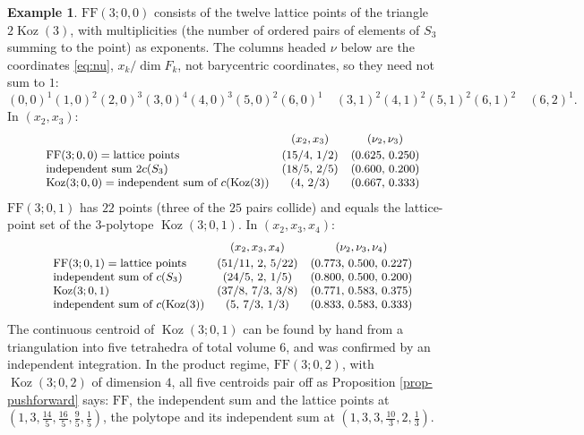 \documentclass[11pt, a4paper, abstract=yes]{scrartcl}
\theoremstyle{definition}
\newtheorem{mexample}[definition]{Example}
\theoremstyle{remark}
\theoremstyle{plain}
\theoremstyle{remark}
\theoremstyle{plain}
\newcommand{\Koz}{\operatorname{Koz}}
\newcommand{\FF}{\mathrm{FF}}
\begin{document}
\begin{mexample}
\(\FF(3;0,0)\) consists of the twelve lattice points of the triangle \(2\Koz(3)\), with multiplicities (the
number of ordered pairs of elements of \(S_3\) summing to the point) as exponents. The columns
headed \(\nu\) below are the coordinates \eqref{eq:nu}, \(x_k/\dim F_k\), not barycentric
coordinates, so they need not sum to \(1\):
\[
  (0,0)^1(1,0)^2(2,0)^3(3,0)^4(4,0)^3(5,0)^2(6,0)^1\quad(3,1)^2(4,1)^2(5,1)^2(6,1)^2\quad(6,2)^1 .
\]
In
\((x_2,x_3)\):
\[\small
\begin{array}{lcc}
 & (x_2,x_3) & (\nu_2,\nu_3)\\[2pt]
\FF(3;0,0)=\text{lattice points} & (15/4,\,1/2) & (0.625,\,0.250)\\
\text{independent sum } 2c(S_3) & (18/5,\,2/5) & (0.600,\,0.200)\\
\Koz(3;0,0)=\text{independent sum of }c(\Koz(3)) & (4,\,2/3) & (0.667,\,0.333)
\end{array}
\]
\(\FF(3;0,1)\) has \(22\) points (three of the \(25\) pairs collide) and equals the lattice-point
set of the \(3\)-polytope \(\Koz(3;0,1)\). In \((x_2,x_3,x_4)\):
\[\small
\begin{array}{lcc}
 & (x_2,x_3,x_4) & (\nu_2,\nu_3,\nu_4)\\[2pt]
\FF(3;0,1)=\text{lattice points} & (51/11,\,2,\,5/22) & (0.773,\,0.500,\,0.227)\\
\text{independent sum of }c(S_3) & (24/5,\,2,\,1/5) & (0.800,\,0.500,\,0.200)\\
\Koz(3;0,1) & (37/8,\,7/3,\,3/8) & (0.771,\,0.583,\,0.375)\\
\text{independent sum of }c(\Koz(3)) & (5,\,7/3,\,1/3) & (0.833,\,0.583,\,0.333)
\end{array}
\]
The continuous centroid of \(\Koz(3;0,1)\) can be found by hand from a triangulation into five
tetrahedra of total volume \(6\), and was confirmed by an independent integration. In the product regime,
\(\FF(3;0,2)\), with \(\Koz(3;0,2)\) of dimension \(4\), all five centroids pair off as Proposition \ref{prop-pushforward} says: \(\FF\), the
independent sum and the lattice points at \((1,3,\tfrac{14}5,\tfrac{16}5,\tfrac95,\tfrac15)\), the polytope
and its independent sum at \((1,3,3,\tfrac{10}3,2,\tfrac13)\).
\label{ex-centroid-rank2}
\end{mexample}
\end{document}
